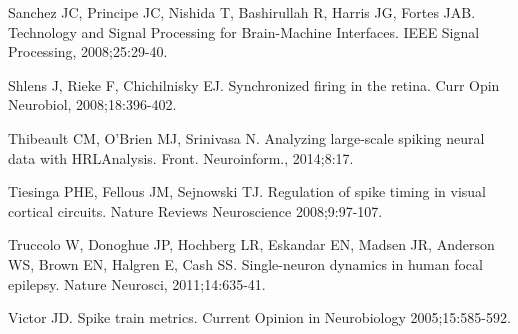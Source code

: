 \documentclass[10pt,twocolumn]{elsart5p}
\begin{document}
\begin{thebibliography}{25}
Sanchez JC, Principe JC, Nishida T, Bashirullah R, Harris JG, Fortes JAB. Technology and Signal Processing for Brain-Machine Interfaces. IEEE Signal Processing, 2008;25:29-40.

Shlens J, Rieke F, Chichilnisky EJ. Synchronized firing in the retina. Curr Opin Neurobiol, 2008;18:396-402.

Thibeault CM, {O'Brien} MJ, Srinivasa N. Analyzing large-scale spiking neural data with HRLAnalysis. Front. Neuroinform., 2014;8:17.

Tiesinga PHE, Fellous JM, Sejnowski TJ. Regulation of spike timing in visual cortical circuits. Nature Reviews Neuroscience 2008;9:97-107.

Truccolo W, Donoghue JP, Hochberg LR, Eskandar EN, Madsen JR, Anderson WS, Brown EN, Halgren E, Cash SS. Single-neuron dynamics in human focal epilepsy. Nature Neurosci, 2011;14:635-41.

Victor JD. Spike train metrics. Current Opinion in Neurobiology 2005;15:585-592.

\end{thebibliography}





%

%
%
%
\end{document}
